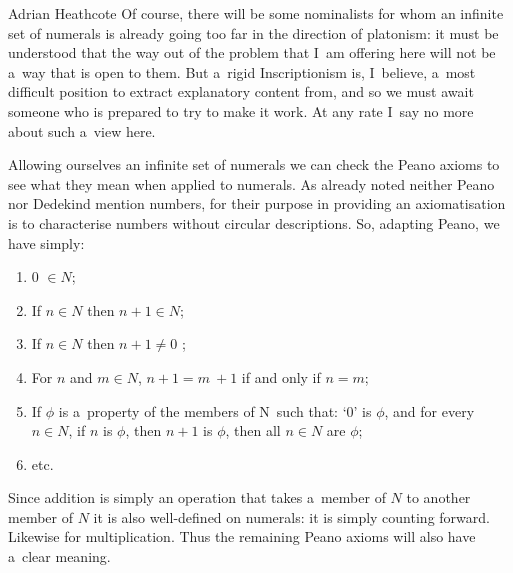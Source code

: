 \begin{artengenv}{Adrian Heathcote}
Of course, there will be some nominalists for whom an infinite set of numerals is already going too far in the direction of platonism: it must be understood that the way out of the problem that I~am offering here will not be a~way that is open to them. But a~rigid Inscriptionism is, I~believe, a~most difficult position to extract explanatory content from, and so we must await someone who is prepared to try to make it work. At any rate I~say no more about such a~view here.

Allowing ourselves an infinite set of numerals we can check the Peano axioms to see what they mean when applied to numerals. As already noted neither Peano nor Dedekind mention numbers, for their purpose in providing an axiomatisation is to characterise numbers without circular descriptions. So, adapting Peano, we have simply:

\begin{enumerate}[label=P*\Roman* :]

  \item 0 $\in N$;
  
  \item If $n \in N$ then $n + 1 \in N$;
  
  \item If $n \in N$ then $n + 1 \neq 0$ ;
  
  \item For $n$ and $m \in N$, $n + 1 = m~+ 1$ if and only if $n = m$;
  
  \item If $\phi$ is a~property of the members of N~such that: `0' is $\phi$, and for every $n \in N$, if $n$ is $\phi$, then $n + 1$ is $\phi$, then all $n \in N$ are $\phi$;
  
  \item etc.
  \end{enumerate}
Since addition is simply an operation that takes a~member of $N$ to another member of $N$ it is also well-defined on numerals: it is simply counting forward. Likewise for multiplication. Thus the remaining Peano axioms will also have a~clear meaning.


\end{artengenv}
